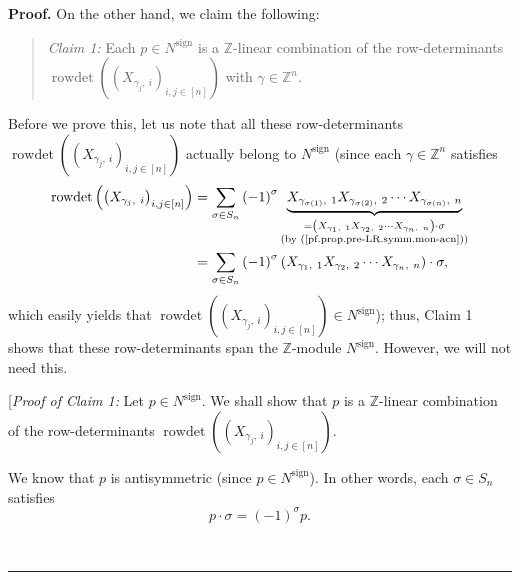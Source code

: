 \documentclass
[numbers=enddot,12pt,final,onecolumn,notitlepage,english]{scrartcl}%
\theoremstyle{definition}
\newenvironment{statement}{\begin{quote}}{\end{quote}}
\newenvironment{proof}[1][Proof]{\noindent\textbf{#1.} }{\ \rule{0.5em}{0.5em}}
\let\sumnonlimits\sum
\renewcommand{\sum}{\sumnonlimits\limits}
\begin{document}
\begin{proof}
On the other hand, we claim the following:

\begin{statement}
\textit{Claim 1:} Each $p\in N^{\operatorname*{sign}}$ is a $\mathbb{Z}%
$-linear combination of the row-determinants $\operatorname*{rowdet}\left(
\left(  X_{\gamma_{j},\ i}\right)  _{i,j\in\left[  n\right]  }\right)  $ with
$\gamma\in\mathbb{Z}^{n}$.
\end{statement}

Before we prove this, let us note that all these row-determinants
\newline$\operatorname*{rowdet}\left(  \left(  X_{\gamma_{j},\ i}\right)
_{i,j\in\left[  n\right]  }\right)  $ actually belong to
$N^{\operatorname*{sign}}$ (since each $\gamma\in\mathbb{Z}^{n}$ satisfies%
\begin{align*}
\operatorname*{rowdet}\left(  \left(  X_{\gamma_{j},\ i}\right)
_{i,j\in\left[  n\right]  }\right)   &  =\sum_{\sigma\in S_{n}}\left(
-1\right)  ^{\sigma}\underbrace{X_{\gamma_{\sigma\left(  1\right)  }%
,\ 1}X_{\gamma_{\sigma\left(  2\right)  },\ 2}\cdots X_{\gamma_{\sigma\left(
n\right)  },\ n}}_{\substack{=\left(  X_{\gamma_{1},\ 1}X_{\gamma_{2}%
,\ 2}\cdots X_{\gamma_{n},\ n}\right)  \cdot\sigma\\\text{(by
(\ref{pf.prop.pre-LR.symm.mon-acn}))}}}\\
&  =\sum_{\sigma\in S_{n}}\left(  -1\right)  ^{\sigma}\left(  X_{\gamma
_{1},\ 1}X_{\gamma_{2},\ 2}\cdots X_{\gamma_{n},\ n}\right)  \cdot\sigma,
\end{align*}
which easily yields that $\operatorname*{rowdet}\left(  \left(  X_{\gamma
_{j},\ i}\right)  _{i,j\in\left[  n\right]  }\right)  \in
N^{\operatorname*{sign}}$); thus, Claim 1 shows that these row-determinants
span the $\mathbb{Z}$-module $N^{\operatorname*{sign}}$. However, we will not
need this. \medskip

[\textit{Proof of Claim 1:} Let $p\in N^{\operatorname*{sign}}$. We shall show
that $p$ is a $\mathbb{Z}$-linear combination of the row-determinants
$\operatorname*{rowdet}\left(  \left(  X_{\gamma_{j},\ i}\right)
_{i,j\in\left[  n\right]  }\right)  $.

We know that $p$ is antisymmetric (since $p\in N^{\operatorname*{sign}}$). In
other words, each $\sigma\in S_{n}$ satisfies%
\begin{equation}
p\cdot\sigma=\left(  -1\right)  ^{\sigma}p. \label{pf.prop.pre-LR.symm.asy}%
\end{equation}



\end{proof}
\end{document}
